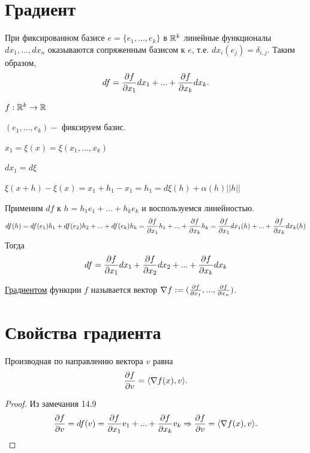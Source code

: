     \section{Градиент}
    
    \begin{mention}
    	При фиксированном базисе $e = \{e_1, ..., e_k\}$ в $\mathbb R^k$ линейные функционалы $dx_1, ..., dx_n$ оказываются сопряженным базисом к $e$, т.е. $dx_i(e_j) = \delta_{i,j}$. Таким образом,
    	\[ df = \frac{\partial f}{\partial x_1} dx_1 + ... + \frac{\partial f}{\partial x_k} dx_k. \]
    \end{mention}
    
    \begin{explanation}
	    $f: \mathbb R^k \rightarrow \mathbb R$
	    
	    $(e_1, ..., e_k) -$ фиксируем базис.
	    
	    $x_1 = \xi(x) = \xi(x_1, ..., x_k)$
	    
	    $dx_1 = d\xi$
	    
	    $\xi(x + h) - \xi(x) = x_1 + h_1 - x_1 = h_1 = d\xi(h) + \alpha(h) ||h||$
	    
	    Применим $df$ к $h = h_1 e_1 + ... + h_k e_k$ и воспользуемся линейностью.
	    \[ df(h) = df(e_1) h_1 + df(e_2) h_2 + ... + df(e_k) h_k = \frac{\partial f}{\partial x_1}h_1 + ... + \frac{\partial f}{\partial x_k}h_k = \frac{\partial f}{\partial x_1} dx_1(h) + ... + \frac{\partial f}{\partial x_k} dx_k(h) \]    
	    Тогда	    
	    \[ df = \frac{\partial f}{\partial x_1} dx_1 + \frac{\partial f}{\partial x_2} dx_2 + ... + \frac{\partial f}{\partial x_k} dx_k \]
    \end{explanation}
    
    \begin{definition}
    	\underline{Градиентом} функции $f$ называется вектор $\nabla f := (\frac{\partial f}{\partial x_1}, ..., \frac{\partial f}{\partial x_n})$.
    \end{definition}
    
    \section{Свойства градиента}
    
    \begin{sentence}
    	Производная по направлению вектора $v$ равна
        \[ \frac{\partial f}{\partial v} = \langle \nabla f(x), v \rangle. \]
    \end{sentence}
    
    \begin{proof}    
	    Из замечания 14.9
	    \[ \frac{\partial f}{\partial v} = df(v) = \frac{\partial f}{\partial x_1}v_1 + ... + \frac{\partial f}{\partial x_k}v_k \Rightarrow \frac{\partial f}{\partial v} = \langle \nabla f(x), v \rangle. \]
    \end{proof}
    
